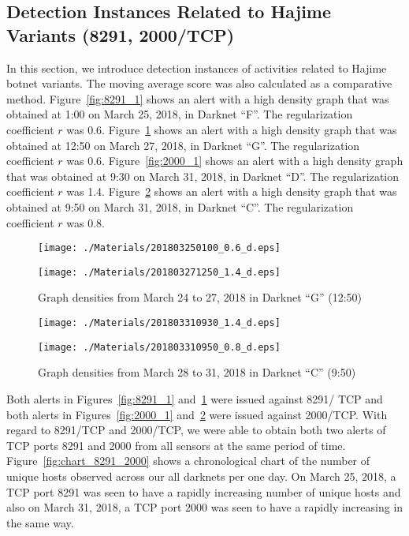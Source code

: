 \documentclass[letterpaper]{sig-alternate-10pt}
\begin{document}
\subsection{Detection Instances Related to Hajime \\Variants (8291, 2000/TCP)}
In this section, we introduce detection instances of activities related to Hajime botnet variants.
The moving average score was also calculated as a comparative method.
Figure~\ref{fig:8291_1} shows an alert with a high density graph that was obtained at 1:00 on March 25, 2018, in Darknet ``F''.
The regularization coefficient $r$ was 0.6.
Figure~\ref{fig:8291_2} shows an alert with a high density graph that was obtained at 12:50 on March 27, 2018, in Darknet ``G''.
The regularization coefficient $r$ was 0.6.
Figure~\ref{fig:2000_1} shows an alert with a high density graph that was obtained at 9:30 on March 31, 2018, in Darknet ``D''.
The regularization coefficient $r$ was 1.4.
Figure~\ref{fig:2000_2} shows an alert with a high density graph that was obtained at 9:50 on March 31, 2018, in Darknet ``C''.
The regularization coefficient $r$ was 0.8.

\begin{figure}[htb]
\begin{center}
	\texttt{[image: ./Materials/201803250100\_0.6\_d.eps]}
	\caption{Graph densities from March 22 to 25, 2018 in Darknet ``F'' (1:00)}
  	\label{fig:8291_1}
	\vspace*{0.5cm}
	\texttt{[image: ./Materials/201803271250\_1.4\_d.eps]}
	\caption{Graph densities from March 24 to 27, 2018 in Darknet ``G'' (12:50)}
  	\label{fig:8291_2}
\end{center}
\end{figure}

\begin{figure}[htb]
\begin{center}
	\texttt{[image: ./Materials/201803310930\_1.4\_d.eps]}
	\caption{Graph densities from March 28 to 31, 2018 in Darknet ``D'' (9:30)}
  	\label{fig:2000_1}
	\vspace*{0.5cm}
	\texttt{[image: ./Materials/201803310950\_0.8\_d.eps]}
	\caption{Graph densities from March 28 to 31, 2018 in Darknet ``C'' (9:50)}
  	\label{fig:2000_2}
\end{center}
\end{figure}

Both alerts in Figures~\ref{fig:8291_1} and~\ref{fig:8291_2} were issued against 8291/ TCP and both alerts in Figures~\ref{fig:2000_1} and~\ref{fig:2000_2} were issued against 2000/TCP.
With regard to 8291/TCP and 2000/TCP, we were able to obtain both two alerts of TCP ports 8291 and 2000 from all sensors at the same period of time.
Figure~\ref{fig:chart_8291_2000} shows a chronological chart of the number of unique hosts observed across our all darknets per one day.
On March 25, 2018, a TCP port 8291 was seen to have a rapidly increasing number of unique hosts and also on March 31, 2018, a TCP port 2000 was seen to have a rapidly increasing in the same way.
\end{document}
